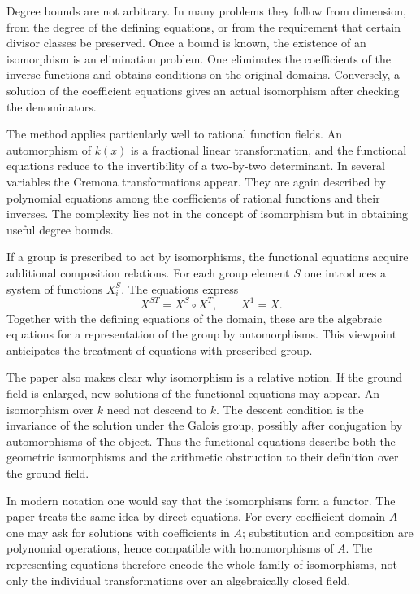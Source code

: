 \documentclass[12pt]{article}
\begin{document}
Degree bounds are not arbitrary. In many problems they follow from dimension, from the degree of the
defining equations, or from the requirement that certain divisor classes be preserved. Once a bound
is known, the existence of an isomorphism is an elimination problem. One eliminates the coefficients
of the inverse functions and obtains conditions on the original domains. Conversely, a solution of
the coefficient equations gives an actual isomorphism after checking the denominators.


The method applies particularly well to rational function fields. An automorphism of \(k(x)\) is a
fractional linear transformation, and the functional equations reduce to the invertibility of a
two-by-two determinant. In several variables the Cremona transformations appear. They are again
described by polynomial equations among the coefficients of rational functions and their inverses.
The complexity lies not in the concept of isomorphism but in obtaining useful degree bounds.


If a group is prescribed to act by isomorphisms, the functional equations acquire additional
composition relations. For each group element \(S\) one introduces a system of functions \(X_i^S\).
The equations express \[   X^{ST}=X^S\circ X^T,   \qquad X^1=X. \] Together with the defining
equations of the domain, these are the algebraic equations for a representation of the group by
automorphisms. This viewpoint anticipates the treatment of equations with prescribed group.


The paper also makes clear why isomorphism is a relative notion. If the ground field is enlarged,
new solutions of the functional equations may appear. An isomorphism over \(\bar k\) need not
descend to \(k\). The descent condition is the invariance of the solution under the Galois group,
possibly after conjugation by automorphisms of the object. Thus the functional equations describe
both the geometric isomorphisms and the arithmetic obstruction to their definition over the ground
field.


In modern notation one would say that the isomorphisms form a functor. The paper treats the same
idea by direct equations. For every coefficient domain \(A\) one may ask for solutions with
coefficients in \(A\); substitution and composition are polynomial operations, hence compatible with
homomorphisms of \(A\). The representing equations therefore encode the whole family of
isomorphisms, not only the individual transformations over an algebraically closed field.
\end{document}

